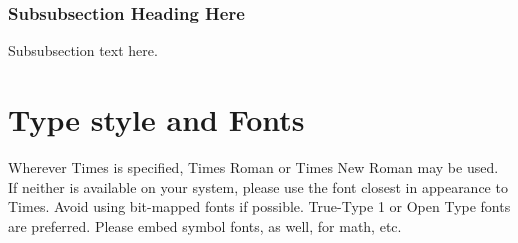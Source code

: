 \documentclass[10pt, conference, compsocconf]{IEEEtran}
\begin{document}
\subsubsection{Subsubsection Heading Here}
Subsubsection text here.

\section{Type style and Fonts}
Wherever Times is specified, Times Roman or Times New Roman may be used. If neither is available on your system, please use the font closest in appearance to Times. Avoid using bit-mapped fonts if possible. True-Type 1 or Open Type fonts are preferred. Please embed symbol fonts, as well, for math, etc.


%
%

\end{document}
